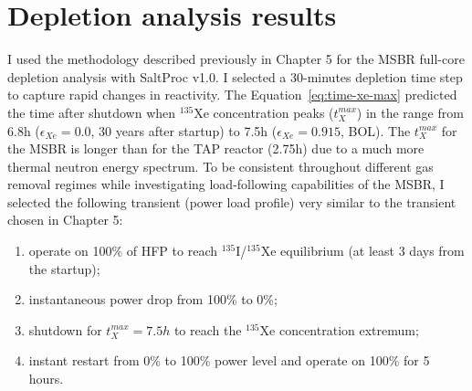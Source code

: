 \section{Depletion analysis results}
I used the methodology described previously in Chapter 5 for the \gls{MSBR} 
full-core depletion analysis with SaltProc v1.0. I selected a 30-minutes  
depletion time step to capture rapid changes in reactivity. 
The Equation~\ref{eq:time-xe-max} predicted the time after shutdown when 
$^{135}$Xe concentration peaks ($t^{max}_X$) in the range from 6.8h 
($\epsilon_{Xe}=0.0$, 30 years after startup) to 7.5h ($\epsilon_{Xe}=0.915$, 
\gls{BOL}). The $t^{max}_X$ for the \gls{MSBR} is longer than 
for the \gls{TAP} reactor (2.75h) due to a much more thermal neutron energy 
spectrum. To be consistent throughout different gas removal regimes while 
investigating load-following capabilities of the \gls{MSBR}, I selected the
following transient (power load profile) very similar to the transient chosen 
in Chapter 5:
\begin{enumerate}[label=(\alph*), noitemsep, topsep=0pt]
	\item operate on 100\% of \gls{HFP} to reach $^{135}$I/$^{135}$Xe 
	equilibrium (at 
	least 3 days from the startup);
	\item instantaneous power drop from 100\% to 0\%;
	\item shutdown for $t^{max}_X=7.5h$ to reach the $^{135}$Xe concentration 
	extremum;
	\item instant restart from 0\% to 100\% power level and operate on 100\% 
	for 5 hours.
\end{enumerate}


